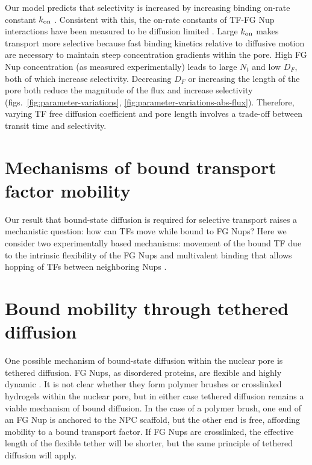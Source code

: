 Our model predicts that selectivity is increased by increasing binding
on-rate constant $k_{\rm on}$ . Consistent
with this, the on-rate constants of TF-FG Nup interactions have been
measured to be diffusion limited \cite{milles15, hough15}.  Large
$k_{\rm on}$ makes transport more selective because fast binding kinetics
relative to diffusive motion are necessary to maintain steep
concentration gradients within the pore. High FG Nup concentration (as
measured experimentally) leads to large $N_t$ and low $D_F$, both of
which increase selectivity.  Decreasing $D_F$ or increasing the length
of the pore both reduce the magnitude of the flux and increase
selectivity (figs.~\ref{fig:parameter-variations},
\ref{fig:parameter-variations-abs-flux}). Therefore, varying TF free
diffusion coefficient and pore length involves a trade-off between
transit time and selectivity.


\section{Mechanisms of  bound transport factor mobility}

Our result that bound-state diffusion is required for selective transport raises a mechanistic question: how can TFs move while bound to FG Nups? Here we consider two experimentally based mechanisms: movement of the bound TF due to the intrinsic flexibility of the FG Nups \cite{patel07} and multivalent binding that allows hopping of TFs between neighboring Nups \cite{raveh16}.

\section{Bound mobility through tethered diffusion}
One possible mechanism of bound-state diffusion within the nuclear pore is tethered diffusion.  FG Nups, as disordered proteins, are flexible and highly dynamic \cite{lim07, milles14, hough15}. It is not clear whether they form polymer brushes or crosslinked hydrogels within the nuclear pore, but in either case tethered diffusion remains a viable mechanism of bound diffusion.  In the case of a polymer brush, one end of an FG Nup is anchored to the NPC scaffold, but the other end is free, affording mobility to a bound transport factor.  If FG Nups are crosslinked, the effective length of the flexible tether will be shorter, but the same principle of tethered diffusion will apply.

